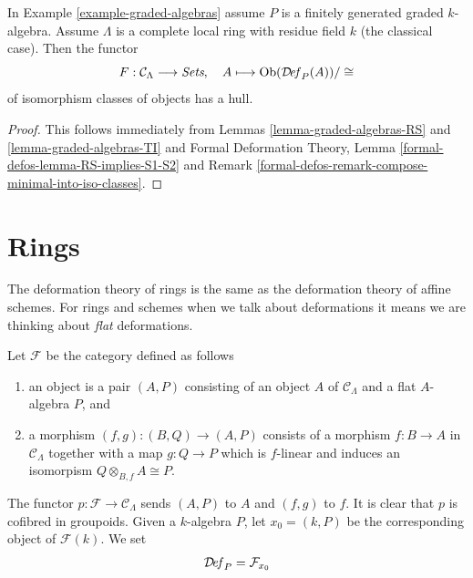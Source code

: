 \begin{lemma}
\label{lemma-graded-algebras-hull}
In Example \ref{example-graded-algebras} assume $P$ is a finitely generated
graded $k$-algebra. Assume $\Lambda$ is a complete local ring
with residue field $k$
(the classical case). Then the functor
$$
F : \mathcal{C}_\Lambda \longrightarrow \textit{Sets},\quad
A \longmapsto \mathop{\mathrm{Ob}}\nolimits(\mathcal{D}\!\mathit{ef}_P(A))/\cong
$$
of isomorphism classes of objects has a hull.
\end{lemma}

\begin{proof}
This follows immediately from Lemmas \ref{lemma-graded-algebras-RS} and
\ref{lemma-graded-algebras-TI} and
Formal Deformation Theory, Lemma \ref{formal-defos-lemma-RS-implies-S1-S2}
and Remark \ref{formal-defos-remark-compose-minimal-into-iso-classes}.
\end{proof}







\section{Rings}
\label{section-rings}

\noindent
The deformation theory of rings is the same as the deformation theory
of affine schemes. For rings and schemes when we talk about deformations
it means we are thinking about {\it flat} deformations.

\begin{example}[Rings]
\label{example-rings}
Let $\mathcal{F}$ be the category defined as follows
\begin{enumerate}
\item an object is a pair $(A, P)$ consisting of an
object $A$ of $\mathcal{C}_\Lambda$ and a flat $A$-algebra $P$, and
\item a morphism $(f, g) : (B, Q) \to (A, P)$ consists of
a morphism $f : B \to A$ in $\mathcal{C}_\Lambda$ together
with a map $g : Q \to P$ which is $f$-linear and induces an
isomorpism $Q \otimes_{B, f} A \cong P$.
\end{enumerate}
The functor $p : \mathcal{F} \to \mathcal{C}_\Lambda$ sends $(A, P)$
to $A$ and $(f, g)$ to $f$. It is clear that $p$ is cofibred in groupoids.
Given a $k$-algebra $P$, let $x_0 = (k, P)$ be the corresponding object
of $\mathcal{F}(k)$. We set
$$
\mathcal{D}\!\mathit{ef}_P = \mathcal{F}_{x_0}
$$
\end{example}

